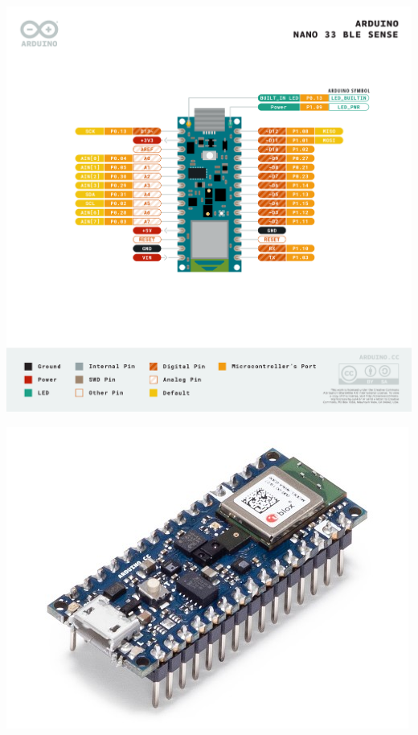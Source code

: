 \documentclass{article}
\begin{document}
\includegraphics[width=\linewidth]{img/Pinout-NANOsense_latest.png}

\includegraphics[width=\linewidth]{img/abx00035_iso.jpg}
\end{document}
